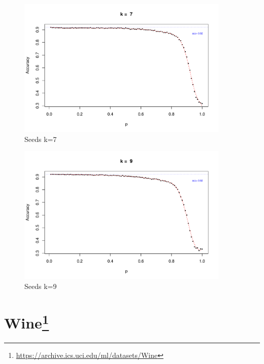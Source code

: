 \documentclass{article}
\begin{document}
\begin{figure}
 \centering
 \includegraphics[width=0.9\textwidth]{./figures/Seeds_k7.pdf}
 \caption{Seeds k=7}
 \label{fig:Seeds7}
\end{figure}
\begin{figure}
 \centering
 \includegraphics[width=0.9\textwidth]{./figures/Seeds_k9.pdf}
 \caption{Seeds k=9}
 \label{fig:Seeds9}
\end{figure}

\FloatBarrier
\section[Wine]{Wine\footnote{\url{https://archive.ics.uci.edu/ml/datasets/Wine}}}
\end{document}
